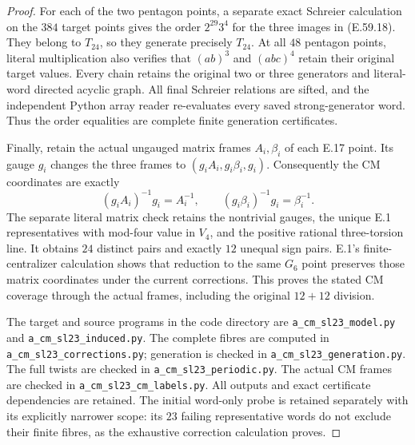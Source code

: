\begin{proof}
For each of the two pentagon points, a separate exact Schreier
calculation on the $384$ target points gives the order
$2^{29}3^4$ for the three images in \textup{(E.59.18)}.
They belong to $T_{24}$, so they generate precisely $T_{24}$.
At all $48$ pentagon points, literal multiplication also verifies
that $(ab)^3$ and $(abc)^4$ retain their original target values.
Every chain retains the original two or three generators and
literal-word directed acyclic graph. All final Schreier relations
are sifted, and the independent Python array reader re-evaluates
every saved strong-generator word. Thus the order equalities
are complete finite generation certificates.

Finally, retain the actual ungauged matrix frames $A_i,\beta_i$
of each E.17 point. Its gauge $g_i$ changes the three frames to
$(g_iA_i,g_i\beta_i,g_i)$. Consequently the CM coordinates are
exactly
\[
 (g_iA_i)^{-1}g_i=A_i^{-1},\qquad
 (g_i\beta_i)^{-1}g_i=\beta_i^{-1}.
 \tag{E.59.20}
\]
The separate literal matrix check retains the nontrivial gauges,
the unique E.1 representatives with mod-four value in $V_4$,
and the positive rational three-torsion line. It obtains $24$
distinct pairs and exactly $12$ unequal sign pairs. E.1's
finite-centralizer calculation shows that reduction to the same
$G_6$ point preserves those matrix coordinates under the current
corrections. This proves the stated CM coverage through the
actual frames, including the original $12+12$ division.

The target and source programs in the code directory are
\texttt{a\_cm\_sl23\_model.py} and
\texttt{a\_cm\_sl23\_induced.py}.
The complete fibres are computed in
\texttt{a\_cm\_sl23\_corrections.py}; generation is checked in
\texttt{a\_cm\_sl23\_generation.py}.
The full twists are checked in \texttt{a\_cm\_sl23\_periodic.py}.
The actual CM frames are checked in \texttt{a\_cm\_sl23\_cm\_labels.py}.
All outputs and exact certificate dependencies are retained.
The initial word-only probe is retained separately with its
explicitly narrower scope: its $23$ failing representative words
do not exclude their finite fibres, as the exhaustive correction
calculation proves.
\end{proof}

